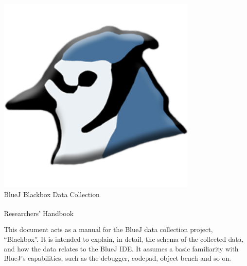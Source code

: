 \documentclass{report}
\begin{document}
\begin{titlepage}
  \begin{center}
    \includegraphics[width=10cm]{../../lib/images/bluej-icon-256.png}\\
    \huge BlueJ Blackbox Data Collection\\~\\Researchers' Handbook
  \end{center}
\end{titlepage}

This document acts as a manual for the BlueJ data collection project,
``Blackbox''.  It is intended to explain, in detail, the schema of the
collected data, and how the data relates to the BlueJ IDE.  It assumes a basic
familiarity with BlueJ's capabilities, such as the debugger, codepad, object
bench and so on.

\begingroup
\let\clearpage\relax
\tableofcontents
\endgroup

\listoftables
\end{document}
